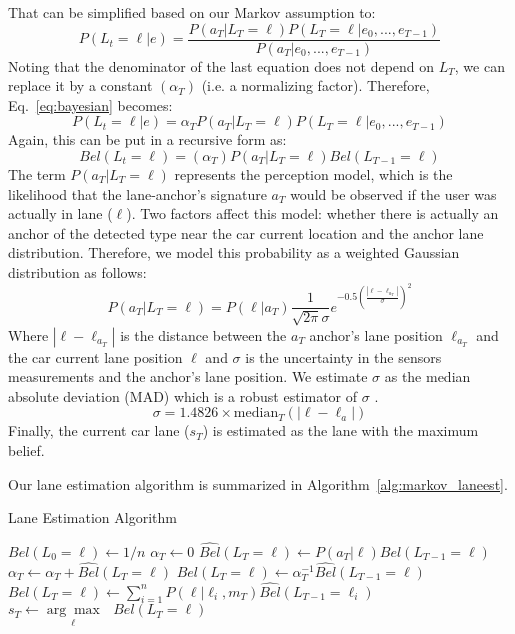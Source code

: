 \documentclass[10pt, conference, compsocconf]{IEEEtran}
\begin{document}
That can be simplified based on our Markov assumption to:
\begin{equation}
P(L_t=\ell|e) = \frac{P(a_T|L_T=\ell)P(L_T=\ell|e_0,...,e_{T-1})}{P(a_T|e_0,...,e_{T-1})}
\label{eq:bayesian}
\end{equation}
Noting that the denominator of the last equation does not depend on $L_T$, we can replace it by a constant $(\alpha_T)$ (i.e. a normalizing factor). Therefore, Eq.~\ref{eq:bayesian} becomes:
\begin{equation}
P(L_t=\ell|e) = \alpha_TP(a_T|L_T=\ell)P(L_T=\ell|e_0,...,e_{T-1})
\end{equation}
Again, this can be put in a recursive form as:
\begin{equation}
Bel(L_t=\ell) = (\alpha_T)P(a_T|L_T=\ell)Bel(L_{T-1}=\ell)
\end{equation}
The term $P(a_T|L_T=\ell)$ represents the perception model, which is the likelihood that the lane-anchor's signature $a_T$ would be observed if the user was actually in lane ($\ell$). Two factors affect this model: whether there is actually an anchor of the detected type near the car current location and the anchor lane distribution. Therefore, we model this probability as a weighted Gaussian distribution as follows:
\begin{equation}
P(a_T|L_T=\ell) = P(\ell|a_T) \frac{1}{\sqrt{2\pi}\sigma}e^{-0.5\left(\frac{|\ell-\ell_{a_T}|}{\sigma}\right)^2}
\end{equation}
Where $|\ell-\ell_{a_T}|$ is the distance between the $a_T$ anchor's lane position $\ell_{a_T}$ and the car current lane position $\ell$ and $\sigma$ is the uncertainty in the sensors measurements and the anchor's lane position. We estimate $\sigma$ as the median absolute deviation (MAD) which is a robust estimator of $\sigma$ \cite{newson2009hidden}.
\begin{equation}
\sigma = 1.4826 \times \text{median}_T(|\ell - \ell_a|)
\end{equation}
Finally, the current car lane ($s_T$) is estimated as the lane with the maximum belief.

Our lane estimation algorithm is summarized in Algorithm~\ref{alg:markov_laneest}.
\begin{algorithm}[!t]\small
\caption{Lane Estimation Algorithm}
\begin{algorithmic}[1]
\State $Bel(L_0 = \ell) \gets 1/n$ \EndFor {}
\State $\alpha_T \gets 0$
 
\State $\hat{Bel}(L_T = \ell) \gets P(a_T|\ell)Bel(L_{T-1} = \ell)$
\State $\alpha_T \gets \alpha_T + \hat{Bel}(L_T = \ell)$
\EndFor
{} 
\State $Bel(L_T = \ell) \gets \alpha_T^{-1} \hat{Bel}(L_{T-1} = \ell)$
\EndFor
\EndIf
{}
 
\State $Bel(L_T=\ell) \gets \sum_{i=1}^{n} P(\ell|\ell_i,m_T)\hat{Bel}(L_{T-1}=\ell_i)$
\EndFor
\EndIf
\State $s_T \gets \underset{\ell}{\arg\max}\text{ } Bel(L_T=\ell)$ 
\EndWhile
\end{algorithmic}
\label{alg:markov_laneest}
\end{algorithm}
\end{document}
